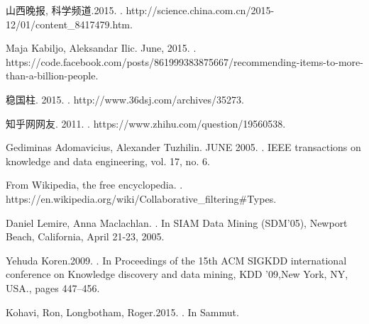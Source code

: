\begin{thebibliography}{10}
山西晚报, 科学频道.2015.
.
\newblock  http://science.china.com.cn/2015-12/01/content\_8417479.htm.

Maja Kabiljo, Aleksandar Ilic. June, 2015.
.
\newblock https://code.facebook.com/posts/861999383875667/recommending-items-to-more-than-a-billion-people.

稳国柱. 2015.
.
\newblock http://www.36dsj.com/archives/35273.

知乎网网友. 2011.
.
\newblock https://www.zhihu.com/question/19560538.

Gediminas Adomavicius, Alexander Tuzhilin. JUNE 2005.
.
\newblock  IEEE transactions on knowledge and data engineering, vol. 17, no. 6.

From Wikipedia, the free encyclopedia.
.
\newblock  https://en.wikipedia.org/wiki/Collaborative\_filtering\#Types.

Daniel Lemire, Anna Maclachlan.
.
\newblock In SIAM Data Mining (SDM'05), Newport Beach, California, April 21-23, 2005.

Yehuda Koren.2009.
.
\newblock In Proceedings of the 15th ACM SIGKDD international conference on Knowledge discovery and data mining, KDD ’09,New York, NY, USA., pages 447–456.

Kohavi, Ron, Longbotham, Roger.2015.
.
\newblock In Sammut.

\end{thebibliography}
